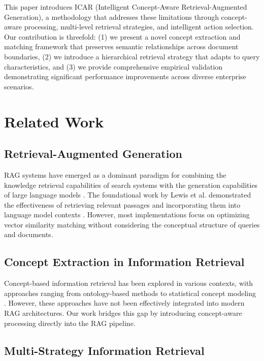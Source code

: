 \documentclass[11pt]{article}
\begin{document}
This paper introduces ICAR (Intelligent Concept-Aware Retrieval-Augmented Generation), a methodology that addresses these limitations through concept-aware processing, multi-level retrieval strategies, and intelligent action selection. Our contribution is threefold: (1) we present a novel concept extraction and matching framework that preserves semantic relationships across document boundaries, (2) we introduce a hierarchical retrieval strategy that adapts to query characteristics, and (3) we provide comprehensive empirical validation demonstrating significant performance improvements across diverse enterprise scenarios.

\section{Related Work}

\subsection{Retrieval-Augmented Generation}

RAG systems have emerged as a dominant paradigm for combining the knowledge retrieval capabilities of search systems with the generation capabilities of large language models \cite{petroni2019}. The foundational work by Lewis et al. demonstrated the effectiveness of retrieving relevant passages and incorporating them into language model contexts \cite{lewis2020}. However, most implementations focus on optimizing vector similarity matching without considering the conceptual structure of queries and documents.

\subsection{Concept Extraction in Information Retrieval}

Concept-based information retrieval has been explored in various contexts, with approaches ranging from ontology-based methods \cite{guarino2009} to statistical concept modeling \cite{manning2008}. However, these approaches have not been effectively integrated into modern RAG architectures. Our work bridges this gap by introducing concept-aware processing directly into the RAG pipeline.

\subsection{Multi-Strategy Information Retrieval}
\end{document}
